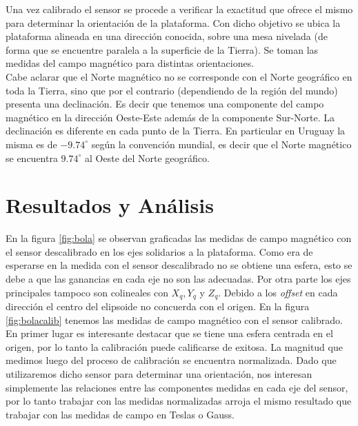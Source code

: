 \documentclass[spanish,12pt,a4paper,titlepage]{report}
\begin{document}
Una vez calibrado el sensor se procede a verificar la exactitud que ofrece el mismo para determinar la orientación de la plataforma. Con dicho objetivo se ubica la plataforma alineada en una dirección conocida, sobre una mesa nivelada (de forma que se encuentre paralela a la superficie de la Tierra). Se toman las medidas del campo magnético para distintas orientaciones.\\
Cabe aclarar que el Norte magn\'etico no se corresponde con el Norte geogr\'afico en toda la Tierra, sino que por el contrario (dependiendo de la regi\'on del mundo) presenta una declinaci\'on. Es decir que tenemos una componente del campo magn\'etico en la dirección Oeste-Este adem\'as de la componente Sur-Norte. La declinaci\'on es diferente en cada punto de la 
Tierra. En particular en Uruguay la misma es de $-9.74^{\circ}$ seg\'un la convenci\'on mundial, es decir que el Norte magn\'etico se encuentra $9.74^{\circ}$ al Oeste del Norte geogr\'afico. 

\section{Resultados y Análisis}
En la figura \ref{fig:bola} se observan graficadas las medidas de campo magnético con el sensor descalibrado en los ejes solidarios a la plataforma. Como era de esperarse en la medida con el sensor descalibrado no se obtiene una esfera, esto se debe a que las ganancias en cada eje no son las adecuadas. Por otra parte los ejes principales tampoco son colineales con $X_q, Y_q $ y $ Z_q$. Debido a los \emph{offset} en cada dirección el centro del elipsoide no concuerda con el origen. En la figura \ref{fig:bolacalib} tenemos las medidas de campo magnético con el sensor calibrado. En primer lugar es interesante destacar que se tiene una esfera centrada en el origen, por lo tanto la calibración puede calificarse de exitosa. La magnitud que medimos luego del proceso de calibración se encuentra normalizada. Dado que utilizaremos dicho sensor para determinar una orientación, nos interesan simplemente las relaciones entre las componentes medidas en cada eje del sensor, por lo tanto trabajar con las medidas normalizadas arroja el mismo resultado que trabajar con las medidas de campo en Teslas o Gauss.
\end{document}

